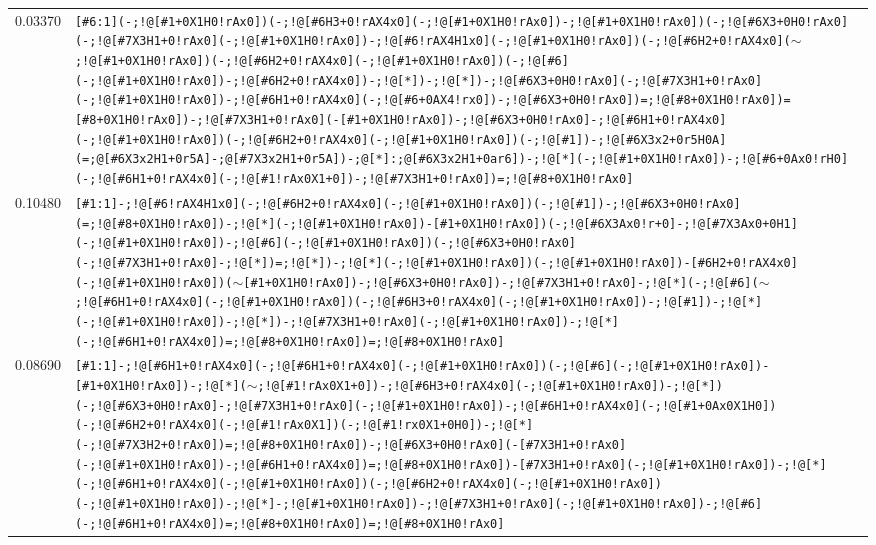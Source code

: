 \begin{longtable}{>{\baselineskip=10pt}p{} >{\baselineskip=10pt}p{}}
0.03370 & \texttt{[\#6:1](-;!@[\#1+0X1H0!rAx0])(-;!@[\#6H3+0!rAX4x0](-;!@[\#1+0X1H0!rAx0])-;!@[\#1+0X1H0!rAx0])(-;!@[\#6X3+0H0!rAx0](-;!@[\#7X3H1+0!rAx0](-;!@[\#1+0X1H0!rAx0])-;!@[\#6!rAX4H1x0](-;!@[\#1+0X1H0!rAx0])(-;!@[\#6H2+0!rAX4x0]($\sim$;!@[\#1+0X1H0!rAx0])(-;!@[\#6H2+0!rAX4x0](-;!@[\#1+0X1H0!rAx0])(-;!@[\#6](-;!@[\#1+0X1H0!rAx0])-;!@[\#6H2+0!rAX4x0])-;!@[*])-;!@[*])-;!@[\#6X3+0H0!rAx0](-;!@[\#7X3H1+0!rAx0](-;!@[\#1+0X1H0!rAx0])-;!@[\#6H1+0!rAX4x0](-;!@[\#6+0AX4!rx0])-;!@[\#6X3+0H0!rAx0])=;!@[\#8+0X1H0!rAx0])=[\#8+0X1H0!rAx0])-;!@[\#7X3H1+0!rAx0](-[\#1+0X1H0!rAx0])-;!@[\#6X3+0H0!rAx0]-;!@[\#6H1+0!rAX4x0](-;!@[\#1+0X1H0!rAx0])(-;!@[\#6H2+0!rAX4x0](-;!@[\#1+0X1H0!rAx0])(-;!@[\#1])-;!@[\#6X3x2+0r5H0A](=;@[\#6X3x2H1+0r5A]-;@[\#7X3x2H1+0r5A])-;@[*]:;@[\#6X3x2H1+0ar6])-;!@[*](-;!@[\#1+0X1H0!rAx0])-;!@[\#6+0Ax0!rH0](-;!@[\#6H1+0!rAX4x0](-;!@[\#1!rAx0X1+0])-;!@[\#7X3H1+0!rAx0])=;!@[\#8+0X1H0!rAx0]} \\ 
0.10480 & \texttt{[\#1:1]-;!@[\#6!rAX4H1x0](-;!@[\#6H2+0!rAX4x0](-;!@[\#1+0X1H0!rAx0])(-;!@[\#1])-;!@[\#6X3+0H0!rAx0](=;!@[\#8+0X1H0!rAx0])-;!@[*](-;!@[\#1+0X1H0!rAx0])-[\#1+0X1H0!rAx0])(-;!@[\#6X3Ax0!r+0]-;!@[\#7X3Ax0+0H1](-;!@[\#1+0X1H0!rAx0])-;!@[\#6](-;!@[\#1+0X1H0!rAx0])(-;!@[\#6X3+0H0!rAx0](-;!@[\#7X3H1+0!rAx0]-;!@[*])=;!@[*])-;!@[*](-;!@[\#1+0X1H0!rAx0])(-;!@[\#1+0X1H0!rAx0])-[\#6H2+0!rAX4x0](-;!@[\#1+0X1H0!rAx0])($\sim$[\#1+0X1H0!rAx0])-;!@[\#6X3+0H0!rAx0])-;!@[\#7X3H1+0!rAx0]-;!@[*](-;!@[\#6]($\sim$;!@[\#6H1+0!rAX4x0](-;!@[\#1+0X1H0!rAx0])(-;!@[\#6H3+0!rAX4x0](-;!@[\#1+0X1H0!rAx0])-;!@[\#1])-;!@[*](-;!@[\#1+0X1H0!rAx0])-;!@[*])-;!@[\#7X3H1+0!rAx0](-;!@[\#1+0X1H0!rAx0])-;!@[*](-;!@[\#6H1+0!rAX4x0])=;!@[\#8+0X1H0!rAx0])=;!@[\#8+0X1H0!rAx0]} \\ 
0.08690 & \texttt{[\#1:1]-;!@[\#6H1+0!rAX4x0](-;!@[\#6H1+0!rAX4x0](-;!@[\#1+0X1H0!rAx0])(-;!@[\#6](-;!@[\#1+0X1H0!rAx0])-[\#1+0X1H0!rAx0])-;!@[*]($\sim$;!@[\#1!rAx0X1+0])-;!@[\#6H3+0!rAX4x0](-;!@[\#1+0X1H0!rAx0])-;!@[*])(-;!@[\#6X3+0H0!rAx0]-;!@[\#7X3H1+0!rAx0](-;!@[\#1+0X1H0!rAx0])-;!@[\#6H1+0!rAX4x0](-;!@[\#1+0Ax0X1H0])(-;!@[\#6H2+0!rAX4x0](-;!@[\#1!rAx0X1])(-;!@[\#1!rx0X1+0H0])-;!@[*](-;!@[\#7X3H2+0!rAx0])=;!@[\#8+0X1H0!rAx0])-;!@[\#6X3+0H0!rAx0](-[\#7X3H1+0!rAx0](-;!@[\#1+0X1H0!rAx0])-;!@[\#6H1+0!rAX4x0])=;!@[\#8+0X1H0!rAx0])-[\#7X3H1+0!rAx0](-;!@[\#1+0X1H0!rAx0])-;!@[*](-;!@[\#6H1+0!rAX4x0](-;!@[\#1+0X1H0!rAx0])(-;!@[\#6H2+0!rAX4x0](-;!@[\#1+0X1H0!rAx0])(-;!@[\#1+0X1H0!rAx0])-;!@[*]-;!@[\#1+0X1H0!rAx0])-;!@[\#7X3H1+0!rAx0](-;!@[\#1+0X1H0!rAx0])-;!@[\#6](-;!@[\#6H1+0!rAX4x0])=;!@[\#8+0X1H0!rAx0])=;!@[\#8+0X1H0!rAx0]} \\ 

\end{longtable}

